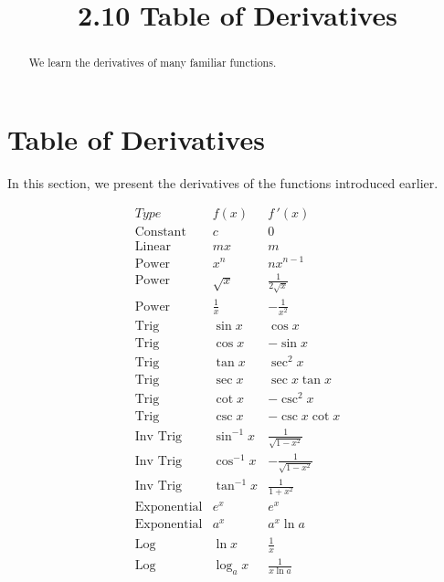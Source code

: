 \documentclass[handout]{ximera}
\title{2.10 Table of Derivatives}
\begin{document}
\begin{abstract}
We learn the derivatives of many familiar functions.
\end{abstract}

\maketitle


\section{Table of Derivatives}

In this section, we present the derivatives of the functions introduced earlier.  

\begin{center}
\[
\begin{array}{c|c|c}
		Type & f(x) & f\,'(x)  \\
		\hline
		\text{Constant} & c & 0 \\[8pt]
		\text{Linear} & mx & m  \\[8pt]
		\text{Power} & x^n & nx^{n-1}  \\[8pt]
		\hline
		\text{Power} & \sqrt x & \displaystyle \frac{1}{2\sqrt x}\\[8pt]
		\text{Power} & \displaystyle \frac{1}{x} & -\displaystyle \frac{1}{x^2}\\[8pt]
	  \hline
		\text{Trig} & \sin x & \cos x \\[8pt]
		\text{Trig} & \cos x & -\sin x \\[8pt]
		\hline
		\text{Trig} & \tan x & \sec^2 x \\[8pt]
		\text{Trig} & \sec x & \sec x\tan x \\[8pt]
		\hline
		\text{Trig} & \cot x & -\csc^2 x \\[8pt]
		\text{Trig} & \csc x & -\csc x\cot x \\[8pt]
		\hline
		\text{Inv Trig} & \sin^{-1} x & \displaystyle{\frac{1}{\sqrt{1-x^2}}} \\[8pt]
		\text{Inv Trig} & \cos^{-1} x & \displaystyle{-\frac{1}{\sqrt{1-x^2}}} \\[8pt]
		\text{Inv Trig} & \tan^{-1} x & \displaystyle{\frac{1}{1+x^2}} \\[8pt]
		\hline
		\text{Exponential} & e^x & e^x \\[8pt]
		\text{Exponential} & a^x & a^x\ln a \\[8pt]
		\hline
		\text{Log} & \ln x & \displaystyle{\frac{1}{x}} \\[8pt]
		\text{Log} & \log_a x & \displaystyle{\frac{1}{x\ln a}}
	\end{array}
    \]
\end{center}
\end{document}
